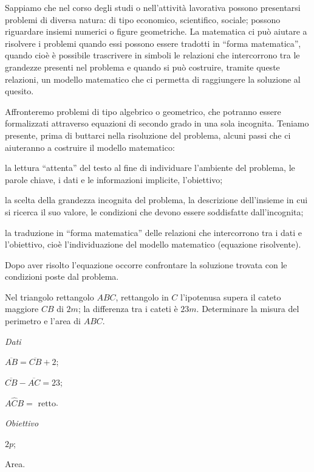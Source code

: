 Sappiamo che nel corso degli studi o nell’attività lavorativa possono presentarsi problemi di diversa natura: di tipo economico, scientifico, sociale; possono riguardare insiemi numerici o figure geometriche. La matematica ci può aiutare a risolvere i problemi quando essi possono essere tradotti in “forma matematica”, quando cioè è possibile trascrivere in simboli le relazioni che intercorrono tra le grandezze presenti nel problema e quando si può costruire, tramite queste relazioni, un modello matematico che ci permetta di raggiungere la soluzione al quesito.

Affronteremo problemi di tipo algebrico o geometrico, che potranno essere formalizzati attraverso equazioni di secondo grado in una sola incognita.
Teniamo presente, prima di buttarci nella risoluzione del problema, alcuni passi che ci aiuteranno a costruire il modello matematico:
\begin{itemize*}
\item la lettura “attenta” del testo al fine di individuare l’ambiente del problema, le parole chiave, i dati e le informazioni implicite, l’obiettivo;
\item la scelta della grandezza incognita del problema, la descrizione dell’insieme in cui si ricerca il suo valore, le condizioni che devono essere soddisfatte dall’incognita;
\item la traduzione in “forma matematica” delle relazioni che intercorrono tra i dati e l’obiettivo, cioè l’individuazione del modello matematico (equazione risolvente).
\end{itemize*}
Dopo aver risolto l’equazione occorre confrontare la soluzione trovata con le condizioni poste dal problema.

\begin{problema}
Nel triangolo rettangolo $ABC$, rettangolo in $C$ l’ipotenusa supera il cateto maggiore $CB$ di $2\unit{m}$; la differenza tra i cateti è $23\unit{m}$. Determinare la misura del perimetro e l’area di $ABC$.
\end{problema}

\begin{multicols}{3}
\emph{Dati}

$\overline {AB} = \overline {CB} + 2$;

$\overline {CB} - \overline {AC} = 23$;

$A \widehat {C} B = \text{ retto}$.

\emph{Obiettivo}

$2 p$;

Area.

 
\end{multicols}

